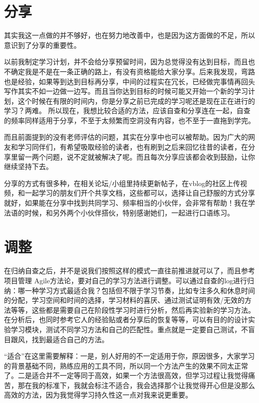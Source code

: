 \documentclass[
]{book}
\begin{document}
\hypertarget{ux5206ux4eab}{%
\section{分享}\label{ux5206ux4eab}}

其实我这一点做的并不够好，也在努力地改善中，也是因为这方面做的不足，所以意识到了分享的重要性。

以前我制定学习计划，并不会给分享预留时间，因为总觉得没有达到目标，而且也不确定我是不是在一条正确的路上，有没有资格能给大家分享。后来我发现，弯路也是经验，如果等到达到目标再分享，中间的过程实在冗长，已经做完事情再回头写作其实不如一边做一边写。而且当你达到目标的时候可能又开始一个新的学习计划，这个时候在有限的时间内，你是分享之前已完成的学习呢还是现在正在进行的学习？两难。
所以现在，我想比较合适的方法，应该自查和分享连在一起，自查的频率同样适用于分享，不至于太频繁而空洞没有内容，也不至于一直拖到学完。

而且前面提到的没有老师评估的问题，其实在分享中也可以被帮助。因为广大的网友和学习同伴们，有希望吸取经验的读者，也有刷到之后来回忆往昔的读者，在分享里留一两个问题，说不定就被解决了呢。而且每次分享应该都会收到鼓励，让你继续坚持下去。

分享的方式有很多种，在相关论坛/小组里持续更新帖子，在vblog的社区上传视频，和一起学习的朋友们开个共享文档，这些都可以，选择让自己舒服的方式分享就好，如果能在分享中找到共同学习、频率相当的小伙伴，会非常有帮助！我在学法语的时候，和另外两个小伙伴搭伙，特别感谢她们，一起进行口语练习。

\hypertarget{ux8c03ux6574}{%
\section{调整}\label{ux8c03ux6574}}

在归纳自查之后，并不是说我们按照这样的模式一直往前推进就可以了，而且参考项目管理
Agile方法论，要对自己的学习方法进行调整。可以通过自查的log进行归纳：哪一种学习方式最适合我？包括但不限于学习节奏，比如专注多久和休息时间的分配，学习空间和时间的选择，学习材料的喜厌、通过测试证明有效/无效的方法等等，这些都是需要自己在阶段性学习时进行分析，然后再实验新的学习方法。在分析后，也同时参考它人的经验贴或者分享后的恢复等等，可以有目的的设计实验学习模块，测试不同学习方法和自己的匹配性。重点就是一定要自己测试，不盲目跟风，找到最适合自己的方法。

``适合''在这里需要解释：一是，别人好用的不一定适用于你，原因很多，大家学习的背景基础不同，熟练应用的工具不同，所以同一个方法产生的效果不同太正常了。二是适合并不一定等同于高效，如果一个方法很高效，但学习过程让我觉得痛苦，那在我的标准下，我就会标注不适合，我会选择那个让我觉得开心但是没那么高效的方法，因为我觉得学习持久性这一点对我来说更重要。
\end{document}
